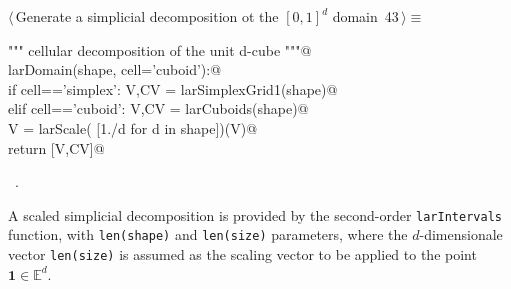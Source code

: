 \documentclass[11pt,oneside]{article}	%
\def\E{\mathbb{E}}
\begin{document}
\begin{flushleft} \small \label{scrap70}
\protect{}$\langle\,$Generate a simplicial decomposition ot the $[0,1]^d$ domain\nobreak\ {\footnotesize 43}$\,\rangle\equiv$
\vspace{-1ex}
\begin{list}{}{} \item
\mbox{}\verb@""" cellular decomposition of the unit d-cube """@\\
\mbox{}\verb@def larDomain(shape, cell='cuboid'):@\\
\mbox{}\verb@   if cell=='simplex': V,CV = larSimplexGrid1(shape)@\\
\mbox{}\verb@   elif cell=='cuboid': V,CV = larCuboids(shape)@\\
\mbox{}\verb@   V = larScale( [1./d for d in shape])(V)@\\
\mbox{}\verb@   return [V,CV]@\\
\mbox{}\verb@@{\NWsep}
\end{list}
\vspace{-1ex}
\footnotesize\addtolength{\baselineskip}{-1ex}
\begin{list}{}{\setlength{\itemsep}{-\parsep}\setlength{\itemindent}{-\leftmargin}}
\item \NWtxtMacroRefIn\ .
\end{list}
\end{flushleft}

A scaled simplicial decomposition is provided by the second-order  \texttt{larIntervals} function, with \texttt{len(shape)} and \texttt{len(size)} parameters, where the $d$-dimensionale vector \texttt{len(size)} is assumed as the scaling vector to be applied to the point $\mathbf{1}\in\E^d$.
\end{document}
